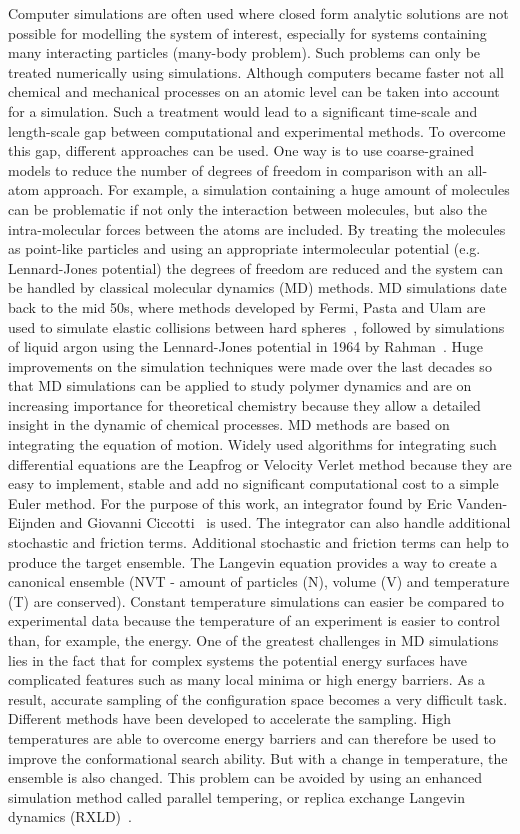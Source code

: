 \documentclass[a4paper]{article}
\begin{document}
Computer simulations are often used where closed form analytic solutions are not possible for modelling the system of interest, especially for systems containing many interacting particles (many-body problem). Such problems can only be treated numerically using simulations. Although computers became faster not all chemical and mechanical processes on an atomic level can be taken into account for a simulation. Such a treatment would lead to a significant time-scale and length-scale gap between computational and experimental methods. To overcome this gap, different approaches can be used. One way is to use coarse-grained models to reduce the number of degrees of freedom in comparison with an all-atom approach. For example, a simulation containing a huge amount of molecules can be problematic if not only the interaction between molecules, but also the intra-molecular forces between the atoms are included. By treating the molecules as point-like particles and using an appropriate intermolecular potential (e.g. Lennard-Jones potential) the degrees of freedom are reduced and the system can be handled by classical molecular dynamics (MD) methods. MD simulations date back to the mid 50s, where methods developed by Fermi, Pasta and Ulam are used to simulate elastic collisions between hard spheres~\cite{fermi1955studies}, followed by simulations of liquid argon using the Lennard-Jones potential in 1964 by Rahman~\cite{rahman1964correlations}. Huge improvements on the simulation techniques were made over the last decades so that MD simulations can be applied to study polymer dynamics and are on increasing importance for theoretical chemistry because they allow a detailed insight in the dynamic of chemical processes. MD methods are based on integrating the equation of motion. Widely used algorithms for integrating such differential equations are the Leapfrog or Velocity Verlet method because they are easy to implement, stable and add no significant computational cost to a simple Euler method. For the purpose of this work, an integrator found by Eric Vanden-Eijnden and Giovanni Ciccotti~\cite{EricVanden-Eijnden2006} is used. The integrator can also handle additional stochastic and friction terms.  Additional stochastic and friction terms can help to produce the target ensemble. The Langevin equation provides a way to create a canonical ensemble (NVT - amount of particles (N), volume (V) and temperature (T) are conserved). Constant temperature simulations can easier be compared to experimental data because the temperature of an experiment is easier to control than, for example, the energy. One of the greatest challenges in MD simulations lies in the fact that for complex systems the potential energy surfaces have complicated features such as many local minima or high energy barriers. As a result, accurate sampling of the configuration space becomes a very difficult task. Different methods have been developed to accelerate the sampling. High temperatures are able to overcome energy barriers and can therefore be used to improve the conformational search ability. But with a change in temperature, the ensemble is also changed. This problem can be avoided by using an enhanced simulation method called parallel tempering, or replica exchange Langevin dynamics (RXLD)~\cite{YujiSugita1999}. 
\end{document}

